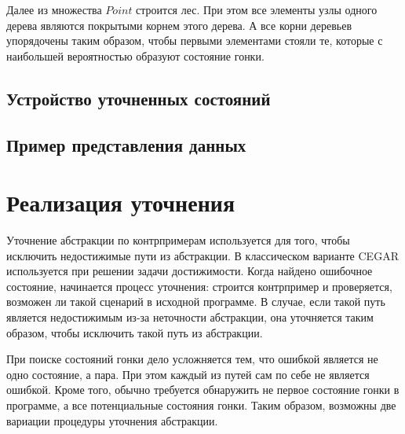 Далее из множества $Point$ строится лес. При этом все элементы узлы одного дерева являются покрытыми корнем этого дерева. А все корни деревьев упорядочены таким образом, чтобы первыми элементами стояли те, которые с наибольшей вероятностью образуют состояние гонки.

\subsection{Устройство уточненных состояний} \label{subsect_impl_refined_usages}

\subsection{Пример представления данных} \label{subsect_impl_example}

\section{Реализация уточнения} \label{sect_impl_refinement}

Уточнение абстракции по контрпримерам используется для того, чтобы исключить недостижимые пути из абстракции.
В классическом варианте CEGAR используется при решении задачи достижимости.
Когда найдено ошибочное состояние, начинается процесс уточнения: строится контрпример и проверяется, возможен ли такой сценарий в исходной программе. В случае, если такой путь является недостижимым из-за неточности абстракции, она уточняется таким образом, чтобы исключить такой путь из абстракции. 

При поиске состояний гонки дело усложняется тем, что ошибкой является не одно состояние, а пара. При этом каждый из путей сам по себе не является ошибкой.
Кроме того, обычно требуется обнаружить не первое состояние гонки в программе, а все потенциальные состояния гонки. 
Таким образом, возможны две вариации процедуры уточнения абстракции.

